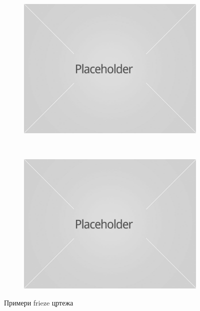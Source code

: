 \documentclass{report}
\theoremstyle{plain}
\theoremstyle{definition}
\begin{document}
\begin{figure}[h]
\centering
\begin{subfigure}{0.4\textwidth}
\includegraphics[width=\textwidth]{placeholder}
\end{subfigure}
~
\begin{subfigure}{0.4\textwidth}
\includegraphics[width=\textwidth]{placeholder}
\end{subfigure}
\caption{Примери frieze цртежа}
\end{figure}\\
\end{document}

